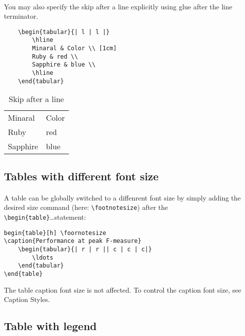 \documentclass[11pt,a4paper]{article}
\begin{document}
\paragraph{}
You may also specify the skip after a line explicitly using glue after the line terminator.
\begin{verbatim}
	\begin{tabular}{| l | l |}
		\hline
		Minaral & Color \\ [1cm]
		Ruby & red \\
		Sapphire & blue \\
		\hline
	\end{tabular}
\end{verbatim}
\begin{table}[htbp]
	\centering
	\begin{tabular}{| l | l |}
		\hline
		Minaral & Color \\ [1cm]
		Ruby & red \\
		Sapphire & blue \\
		\hline
	\end{tabular}
	\caption{Skip after a line}
	\label{skipafterline}
\end{table}

\subsection{Tables with different font size}

\paragraph{}
A table can be globally switched to a diffenrent font size by simply adding the
desired size command (here: \verb|\footnotesize|) after the \\
\verb|\begin{table}|\ldots statement:
\begin{verbatim}
begin{table}[h] \foornotesize
\caption{Performance at peak F-measure}
	\begin{tabular}{| r | r || c | c | c|}
		\ldots
	\end{tabular}
\end{table}
\end{verbatim}

The table caption font size is not affected. To control the caption font size,
see Caption Styles.

\subsection{Table with legend}
\end{document}
